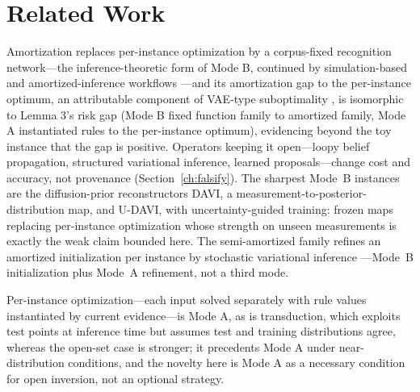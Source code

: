 \section{Related Work}
\label{ch:related}

Amortization replaces per-instance optimization by a corpus-fixed recognition network---the inference-theoretic form of Mode B, continued by simulation-based and amortized-inference workflows \citep{cranmer2020,radev2023}---and its amortization gap to the per-instance optimum, an attributable component of VAE-type suboptimality \citep{cremer2018}, is isomorphic to Lemma 3's risk gap (Mode B fixed function family to amortized family, Mode A instantiated rules to the per-instance optimum), evidencing beyond the toy instance that the gap is positive. Operators keeping it open---loopy belief propagation, structured variational inference, learned proposals---change cost and accuracy, not provenance (Section~\ref{ch:falsify}). The sharpest Mode~B instances are the diffusion-prior reconstructors DAVI, a measurement-to-posterior-distribution map, and U-DAVI, with uncertainty-guided training: frozen maps replacing per-instance optimization \citep{lee2024davi,varshney2026udavi} whose strength on unseen measurements is exactly the weak claim bounded here. The semi-amortized family refines an amortized initialization per instance by stochastic variational inference \citep{kim2018semi}---Mode~B initialization plus Mode~A refinement, not a third mode.

Per-instance optimization---each input solved separately with rule values instantiated by current evidence---is Mode A, as is transduction, which exploits test points at inference time \citep{vapnik1995} but assumes test and training distributions agree, whereas the open-set case is stronger; it precedents Mode A under near-distribution conditions, and the novelty here is Mode A as a necessary condition for open inversion, not an optional strategy.

